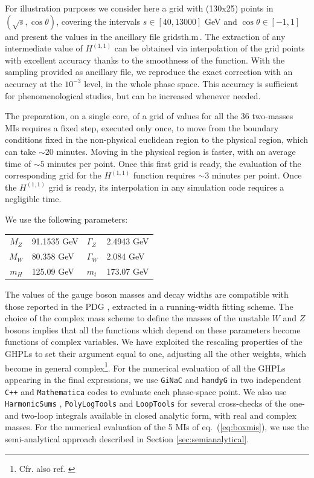 \documentclass[11pt,a4paper]{article}
\begin{document}
For illustration purposes we consider here a grid with (130x25) points
in $(\sqrt{s},\cos\theta)$,
covering the intervals $s\in [40,13000]$ GeV and $\cos\theta\in [-1,1]$
and present the values in the ancillary file \textsf{gridsth.m}\,.
The extraction of any intermediate value
of ${H}^{(1,1)}$
can be obtained via interpolation of the grid points
with excellent accuracy thanks to the smoothness of the function.
  With the sampling provided as ancillary file,
  we reproduce the exact correction with an accuracy at the $10^{-3}$ level, in the whole phase space.
  This accuracy is sufficient for phenomenological studies, but can be increased whenever needed.

  The preparation, on a single core, of a grid of values for all the 36 two-masses  MIs requires a fixed step, executed only once,
  to move from the boundary conditions fixed in the non-physical euclidean region to the physical region, which can take
   $\sim 20$ minutes. Moving in the physical region is faster, with an average time of $\sim 5$ minutes per point.
  Once this first grid is ready, the evaluation of the corresponding grid for the $H^{(1,1)}$ function requires
  $\sim 3$ minutes per point.
  Once the  $H^{(1,1)}$ grid is ready, its interpolation in any simulation code requires a negligible time.

We use the following parameters:
% 
\begin{center}
 \begin{tabular}{c l l l}
 \hline\hline
  $M_Z$ & 91.1535 GeV & $\Gamma_Z$ & 2.4943 GeV\\
  $M_W$ & 80.358 GeV  & $\Gamma_W$ & 2.084 GeV\\
  $m_H$ & 125.09 GeV  & $m_t$ & 173.07 GeV\\
 \hline\hline
 \end{tabular}
% 
\end{center}
%
The values of the gauge boson masses and decay widths
      are compatible with those reported in the PDG \cite{ParticleDataGroup:2020ssz},
      extracted in a running-width fitting scheme.
The choice of the complex mass scheme to define the masses
of the unstable $W$ and $Z$ bosons
implies that all the functions which depend on these parameters
become functions of complex variables.
We have exploited the rescaling properties of the GHPLs
to set their argument equal to one, adjusting all the other weights,
which become in general complex\footnote{Cfr. also ref. \cite{Bonciani:2010ms}}.
%
For the numerical evaluation of all the GHPLs
appearing in the final expressions,
we use {\tt GiNaC} and
{\tt handyG} \cite{Naterop:2019xaf}
in two independent {\tt C++} and {\tt Mathematica} codes
to evaluate each phase-space point.
We also use {\tt HarmonicSums} \cite{Ablinger:2010kw,Ablinger:2014rba}, {\tt PolyLogTools} \cite{Duhr:2019tlz}
  and {\tt LoopTools} \cite{Hahn:1998yk}
  for several cross-checks of the one- and two-loop integrals available in closed analytic form,
  with real and complex masses.
For the numerical evaluation of the 5 MIs of eq.~(\ref{eq:boxmis}),
we use the semi-analytical approach described
in Section \ref{sec:semianalytical}.
\end{document}
